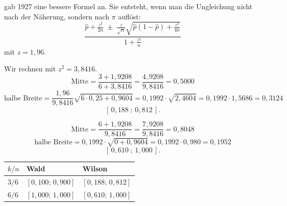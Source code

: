 \begin{merksatz}
 gab 1927 eine bessere Formel an. Sie entsteht, wenn man die Ungleichung nicht nach der Näherung, sondern  nach $\pi$ auflöst:
\[ \frac{\hat p + \frac{z^2}{2n} \;\pm\; \frac{z}{\sqrt n}\sqrt{\hat p(1-\hat p) + \frac{z^2}{4n}}}{1 + \frac{z^2}{n}} \]
mit $z = 1{,}96$.

Wir rechnen mit $z^2 = 3{,}8416$.
\[ \text{Mitte} = \frac{3 + 1{,}9208}{6 + 3{,}8416} = \frac{4{,}9208}{9{,}8416} = 0{,}5000 \]
\[ \text{halbe Breite} = \frac{1{,}96}{9{,}8416}\sqrt{6 \cdot 0{,}25 + 0{,}9604} = 0{,}1992 \cdot \sqrt{2{,}4604} = 0{,}1992 \cdot 1{,}5686 = 0{,}3124 \]
\[ [\,0{,}188\ ;\ 0{,}812\,] . \]

\[ \text{Mitte} = \frac{6 + 1{,}9208}{9{,}8416} = \frac{7{,}9208}{9{,}8416} = 0{,}8048 \]
\[ \text{halbe Breite} = 0{,}1992 \cdot \sqrt{0 + 0{,}9604} = 0{,}1992 \cdot 0{,}980 = 0{,}1952 \]
\[ [\,0{,}610\ ;\ 1{,}000\,] . \]

\begin{center}
\renewcommand{\arraystretch}{1.48}
\begin{tabular}{@{}P{2.2cm}P{2.8cm}P{2.8cm}@{}}
\toprule
$k/n$ & \textbf{Wald} & \textbf{Wilson}\\
\midrule
$3/6$ & $[0{,}100;\,0{,}900]$ & $[0{,}188;\,0{,}812]$\\
$6/6$ & \textcolor{akzent}{$[1{,}000;\,1{,}000]$} & \textcolor{gruen}{$[0{,}610;\,1{,}000]$}\\
\bottomrule
\end{tabular}
\end{center}

\begin{center}
\begin{minipage}{0.88\textwidth}
\end{minipage}
\end{center}
\end{merksatz}

